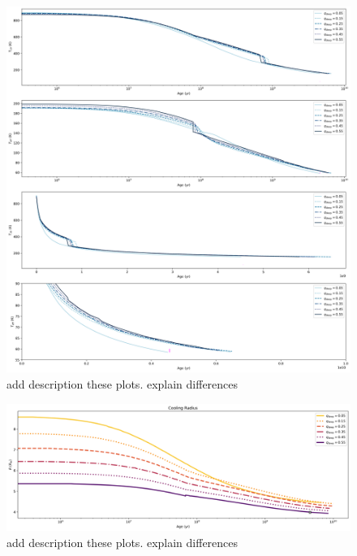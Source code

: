 \documentclass[11pt]{ucscthesisbs}
\begin{document}
\begin{figure}[ht]
 \centerline{
  \includegraphics[scale=0.5]{figures/n_cooling_curves_nz_4096_more_qdeeps.png}
 }
\caption[Inhibition of convection on Uranus]
{add description these plots. explain differences}
\label{fig:radiative}
\end{figure}


\begin{figure}[ht]
 \centerline{
  \includegraphics[scale=0.5]{figures/u_cooling_radius_nz_4096_logx_more_qdeeps.png}
 }
\caption[Inhibition of convection on Uranus]
{add description these plots. explain differences}
\label{fig:radiative}
\end{figure}
\end{document}
